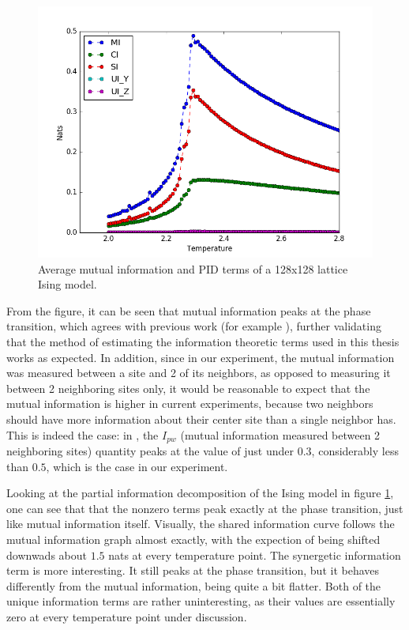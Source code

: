 \documentclass[12pt]{article}
\begin{document}
\begin{figure} [h!]
\begin{center}
\includegraphics[width=\textwidth]{ising-128-pid-2-nbs}
\caption{Average mutual information and PID terms of a 128x128 lattice Ising model.}
\label{fig:ising-128-pid-2-nbs}
\end{center}
\end{figure}

From the figure, it can be seen that mutual information peaks at the phase transition, which agrees with previous work (for example \cite{barnett-ising}), further validating that the method of estimating the information theoretic terms used in this thesis works as expected. In addition, since in our experiment, the mutual information was measured between a site and 2 of its neighbors, as opposed to measuring it between 2 neighboring sites only, it would be reasonable to expect that the mutual information is higher in current experiments, because two neighbors should have more information about their center site than a single neighbor has. This is indeed the case: in \cite{barnett-ising}, the $I_{pw}$ (mutual information measured between 2 neighboring sites) quantity  peaks at the value of just under $0.3$, considerably less than $0.5$, which is the case in our experiment. 

Looking at the partial information decomposition of the Ising model in figure \ref{fig:ising-128-pid-2-nbs}, one can see that that the nonzero terms peak exactly at the phase transition, just like mutual information itself. Visually, the shared information curve follows the mutual information graph almost exactly, with the expection of being shifted downwads about $1.5$ nats at every temperature point. The synergetic information term is more interesting. It still peaks at the phase transition, but it behaves differently from the mutual information, being quite a bit flatter. Both of the unique information terms are rather uninteresting, as their values are essentially zero at every temperature point under discussion. 
\end{document}
